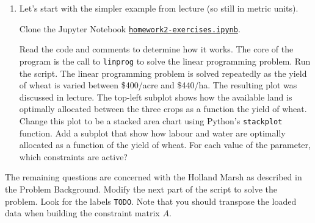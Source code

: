 \documentclass[letter]{article}
\begin{document}
\begin{enumerate}[label=\textbf{\arabic*.}]
	\item Let's start with the simpler example from lecture (so still in metric units). 

	Clone the Jupyter Notebook \href{https://utoronto.syzygy.ca/jupyter/user-redirect/git-pull?repo=https://github.com/bigfatbernie/IBLMathModeling&subPath=homeworks/homework2/homework2-exercises.ipynb}{\tt homework2-exercises.ipynb}.
	
	Read the code and comments to determine how it works. The core of the program is the call to \verb|linprog| to solve the linear programming problem. Run the script. The linear programming problem is solved repeatedly as the yield of wheat is varied between \$400/acre and \$440/ha. The resulting plot was discussed in lecture. The top-left subplot shows how the available land is optimally allocated between the three crops as a function the yield of wheat. Change this plot to be a stacked area chart using Python's \verb|stackplot| function. Add a subplot that show how labour and water are optimally allocated as a function of the yield of wheat. For each value of the parameter, which constraints are active? 
\end{enumerate}

The remaining questions are concerned with the Holland Marsh as described in the Problem Background. 
	Modify the next part of the script to solve the problem. Look for the labels \verb|TODO|. 
	Note that you should transpose the loaded data when building the constraint matrix $A$.
\end{document}
